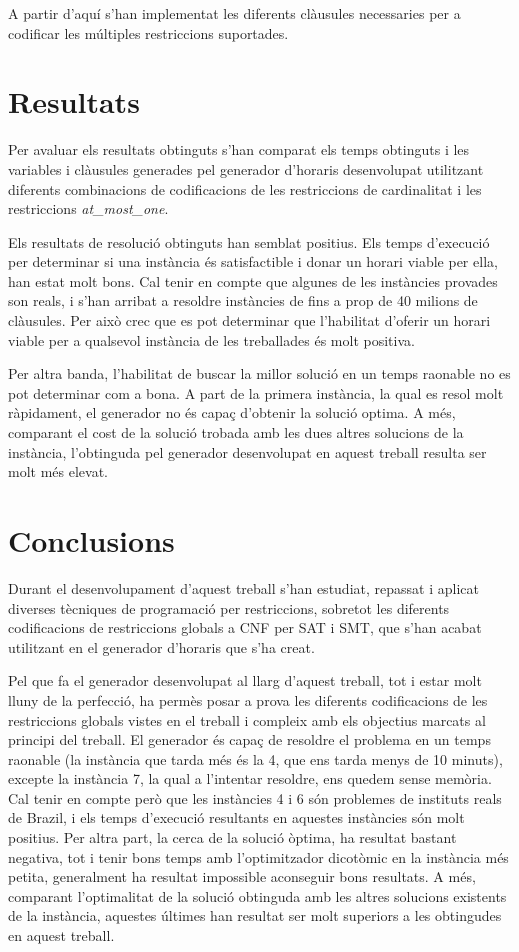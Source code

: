 \documentclass[11pt,a4paper,oneside]{article}
\begin{document}
  A partir d'aquí s'han implementat les diferents clàusules necessaries per a codificar les múltiples restriccions suportades.


  \section{Resultats}

  Per avaluar els resultats obtinguts s'han comparat 
  els temps obtinguts i les variables i clàusules generades pel generador d'horaris desenvolupat utilitzant
  diferents combinacions de codificacions de les restriccions de cardinalitat 
  i les restriccions \textit{at\_most\_one}.
  
  Els resultats de resolució obtinguts han semblat positius. 
  Els temps d'execució per determinar si una instància és satisfactible i donar un horari viable per ella, han estat molt bons. 
  Cal tenir en compte que algunes de les instàncies provades son reals, i s'han arribat a resoldre instàncies de fins a prop de 40 milions de clàusules.
  Per això crec que es pot determinar que l'habilitat d'oferir un horari viable per a qualsevol instància de les treballades és molt positiva.

  Per altra banda, l'habilitat de buscar la millor solució en un temps raonable 
  no es pot determinar com a bona. A part de la primera instància, 
  la qual es resol molt ràpidament, el generador no és capaç d'obtenir la solució optima.
   A més, comparant el cost de la solució trobada amb les dues altres solucions de la instància, l'obtinguda pel generador desenvolupat en aquest treball resulta ser molt més elevat.

  \section{Conclusions}

  Durant el desenvolupament d'aquest treball s'han estudiat, repassat i aplicat diverses tècniques de programació per restriccions, 
  sobretot les diferents codificacions de restriccions globals a CNF per SAT i SMT, que s'han acabat utilitzant en el generador d'horaris que s'ha creat. 

  Pel que fa el generador desenvolupat al llarg d'aquest treball, tot i estar molt lluny de la perfecció, 
  ha permès posar a prova les diferents codificacions de les restriccions globals vistes en el treball 
  i compleix amb els objectius marcats al principi del treball. El generador és capaç de resoldre el problema en un temps raonable (la instància que tarda més és la 4, que ens tarda menys de 10 minuts), 
  excepte la instància 7, la qual a l'intentar resoldre, ens quedem sense memòria. Cal tenir en compte però que les instàncies 4 i 6 són problemes de instituts reals de Brazil, i els temps d'execució resultants en aquestes instàncies són molt positius.
  Per altra part, la cerca de la solució òptima, ha resultat bastant negativa, tot i tenir bons temps amb l'optimitzador dicotòmic en la instància més petita, generalment ha resultat impossible aconseguir bons resultats. 
  A més, comparant l'optimalitat de la solució obtinguda amb les altres solucions existents de la instància, aquestes últimes han resultat ser molt superiors a les obtingudes en aquest treball.
\end{document}
